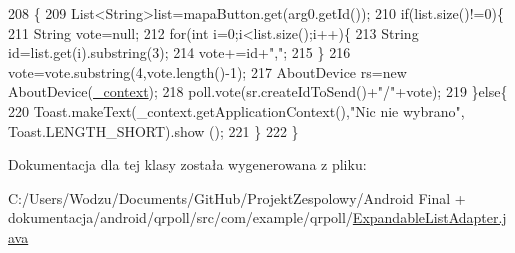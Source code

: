 \begin{DoxyCode}
208                                        \{
209             List<String>list=mapaButton.get(arg0.getId());
210             \textcolor{keywordflow}{if}(list.size()!=0)\{
211                 String vote=null;
212                 \textcolor{keywordflow}{for}(\textcolor{keywordtype}{int} i=0;i<list.size();i++)\{
213                     String \textcolor{keywordtype}{id}=list.get(i).substring(3);
214                     vote+=\textcolor{keywordtype}{id}+\textcolor{stringliteral}{","};           
215                 \}
216                 vote=vote.substring(4,vote.length()-1);
217             AboutDevice rs=\textcolor{keyword}{new} AboutDevice(\hyperlink{classcom_1_1example_1_1qrpoll_1_1_expandable_list_adapter_a7a712744eebf94bc189b44e5d04ff7da}{\_context});
218             poll.vote(sr.createIdToSend()+\textcolor{stringliteral}{"/"}+vote);
219             \}\textcolor{keywordflow}{else}\{
220                 Toast.makeText(\_context.getApplicationContext(),\textcolor{stringliteral}{"Nic nie wybrano"}, Toast.LENGTH\_SHORT).show
      ();
221             \}
222         \}
\end{DoxyCode}


Dokumentacja dla tej klasy została wygenerowana z pliku\+:\begin{DoxyCompactItemize}
\item 
C\+:/\+Users/\+Wodzu/\+Documents/\+Git\+Hub/\+Projekt\+Zespolowy/\+Android Final + dokumentacja/android/qrpoll/src/com/example/qrpoll/\hyperlink{_expandable_list_adapter_8java}{Expandable\+List\+Adapter.\+java}\end{DoxyCompactItemize}
